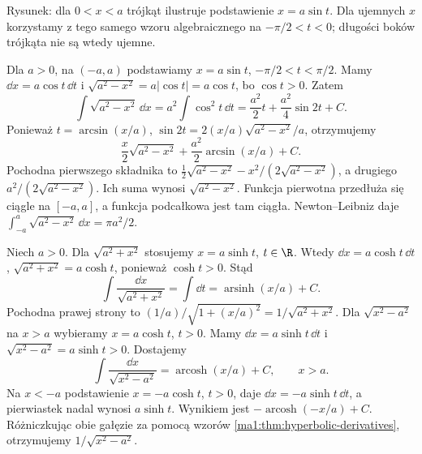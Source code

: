 \begin{center}

\small Rysunek: dla $0<x<a$ trójkąt ilustruje podstawienie $x=a\sin t$. Dla ujemnych $x$ korzystamy z tego samego wzoru algebraicznego na $-\pi/2<t<0$; długości boków trójkąta nie są wtedy ujemne.
\end{center}
\begin{przyklad}
\label{ma1:ex:trig-root-substitution}
Dla $a>0$, na $(-a,a)$ podstawiamy $x=a\sin t$, $-\pi/2<t<\pi/2$. Mamy $\dd x=a\cos t\,\dd t$ i $\sqrt{a^2-x^2}=a|\cos t|=a\cos t$, bo $\cos t>0$. Zatem
\[
 \int\sqrt{a^2-x^2}\,\dd x
 =a^2\int\cos^2t\,\dd t
 =\frac{a^2}{2}t+\frac{a^2}{4}\sin2t+C.
\]
Ponieważ $t=\arcsin(x/a)$, $\sin2t=2(x/a)\sqrt{a^2-x^2}/a$, otrzymujemy
\[
 \frac{x}{2}\sqrt{a^2-x^2}+\frac{a^2}{2}\arcsin(x/a)+C.
\]
Pochodna pierwszego składnika to $\tfrac12\sqrt{a^2-x^2}-x^2/(2\sqrt{a^2-x^2})$, a drugiego $a^2/(2\sqrt{a^2-x^2})$. Ich suma wynosi $\sqrt{a^2-x^2}$. Funkcja pierwotna przedłuża się ciągle na $[-a,a]$, a funkcja podcałkowa jest tam ciągła. Newton--Leibniz daje $\int_{-a}^a\sqrt{a^2-x^2}\,\dd x=\pi a^2/2$.
\end{przyklad}
\begin{przyklad}
\label{ma1:ex:hyperbolic-root-substitution}
Niech $a>0$. Dla $\sqrt{a^2+x^2}$ stosujemy $x=a\sinh t$, $t\in\R$. Wtedy $\dd x=a\cosh t\,\dd t$, $\sqrt{a^2+x^2}=a\cosh t$, ponieważ $\cosh t>0$. Stąd
\[
 \int\frac{\dd x}{\sqrt{a^2+x^2}}
 =\int\dd t=\operatorname{arsinh}(x/a)+C.
\]
Pochodna prawej strony to $(1/a)/\sqrt{1+(x/a)^2}=1/\sqrt{a^2+x^2}$.
Dla $\sqrt{x^2-a^2}$ na $x>a$ wybieramy $x=a\cosh t$, $t>0$. Mamy $\dd x=a\sinh t\,\dd t$ i $\sqrt{x^2-a^2}=a\sinh t>0$. Dostajemy
\[
 \int\frac{\dd x}{\sqrt{x^2-a^2}}
 =\operatorname{arcosh}(x/a)+C,\qquad x>a.
\]
Na $x<-a$ podstawienie $x=-a\cosh t$, $t>0$, daje $\dd x=-a\sinh t\,\dd t$, a pierwiastek nadal wynosi $a\sinh t$. Wynikiem jest $-\operatorname{arcosh}(-x/a)+C$. Różniczkując obie gałęzie za pomocą wzorów \ref{ma1:thm:hyperbolic-derivatives}, otrzymujemy $1/\sqrt{x^2-a^2}$.
\end{przyklad}

